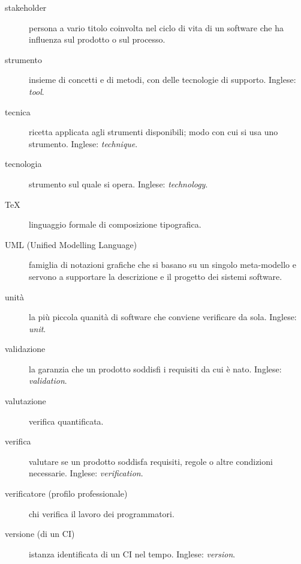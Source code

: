 \documentclass[a4paper]{article}
\begin{document}
\begin{description}
	\item[stakeholder] 

			persona a vario titolo coinvolta nel ciclo di vita di un software che ha influenza sul prodotto o sul processo.
			
	\item[strumento] 

			insieme di concetti e di metodi, con delle tecnologie di supporto. Inglese: \emph{tool}.
			
	\item[tecnica] 

			ricetta applicata agli strumenti disponibili; modo con cui si usa uno strumento. Inglese: \emph{technique}.
			
	\item[tecnologia] 

			strumento sul quale si opera. Inglese: \emph{technology}.
			
	\item[TeX] 

			linguaggio formale di composizione tipografica.
			
	\item[UML (Unified Modelling Language)] 

			famiglia di notazioni grafiche che si basano su un singolo meta-modello e servono a supportare la descrizione e il progetto dei sistemi software.
			
	\item[unità] 

			la più piccola quanità di software che conviene verificare da sola. Inglese: \emph{unit}.
			
	\item[validazione] 

			la garanzia che un prodotto soddisfi i requisiti da cui è nato. Inglese: \emph{validation}.
			
	\item[valutazione] 

			verifica quantificata.
			
	\item[verifica] 

			valutare se un prodotto soddisfa requisiti, regole o altre condizioni necessarie. Inglese: \emph{verification}.
			
	\item[verificatore (profilo professionale)] 

			chi verifica il lavoro dei programmatori.
			
	\item[versione (di un CI)] 

			istanza identificata di un CI nel tempo. Inglese: \emph{version}.
		
	\end{description}
\end{document}
